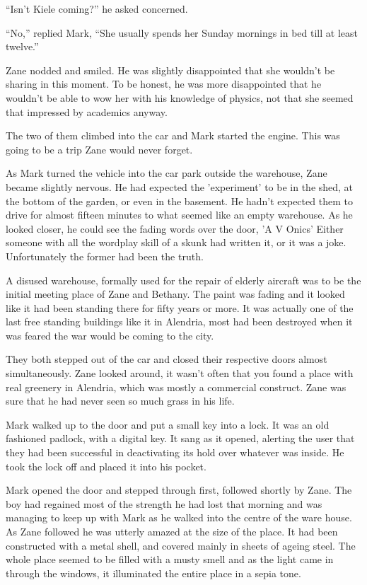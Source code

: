 ``Isn't Kiele coming?'' he asked concerned.

``No,'' replied Mark, ``She usually spends her Sunday mornings in bed till at least twelve.''  

Zane nodded and smiled.  He was slightly disappointed that she wouldn't be sharing in this moment.  To be honest, he was more disappointed that he wouldn't be able to wow her with his knowledge of physics, not that she seemed that impressed by academics anyway.

The two of them climbed into the car and Mark started the engine.  This was going to be a trip Zane would never forget.  



\thoughtbreak



As Mark turned the vehicle into the car park outside the warehouse, Zane became slightly nervous.  He had expected the 'experiment' to be in the shed, at the bottom of the garden, or even in the basement.  He hadn't expected them to drive for almost fifteen minutes to what seemed like an empty warehouse.  As he looked closer, he could see the fading words over the door, 'A V Onics'  Either someone with all the wordplay skill of a skunk had written it, or it was a joke.  Unfortunately the former had been the truth.

A disused warehouse, formally used for the repair of elderly aircraft was to be the initial meeting place of Zane and Bethany.  The paint was fading and it looked like it had been standing there for fifty years or more.  It was actually one of the last free standing buildings like it in Alendria, most had been destroyed when it was feared the war would be coming to the city.  

They both stepped out of the car and closed their respective doors almost simultaneously.  Zane looked around, it wasn't often that you found a place with real greenery in Alendria,  which was mostly a commercial construct.  Zane was sure that he had never seen so much grass in his life.  

Mark walked up to the door and put a small key into a lock.  It was an old fashioned padlock, with a digital key.  It sang as it opened, alerting the user that they had been successful in deactivating its hold over whatever was inside.  He took the lock off and placed it into his pocket.

Mark opened the door and stepped through first, followed shortly by Zane.  The boy had regained most of the strength he had lost that morning and was managing to keep up with Mark as he walked into the centre of the ware house.  As Zane followed he was utterly amazed at the size of the place.  It had been constructed with a metal shell, and covered mainly in sheets of ageing steel.  The whole place seemed to be filled with a musty smell and as the light came in through the windows, it illuminated the entire place in a sepia tone.  

